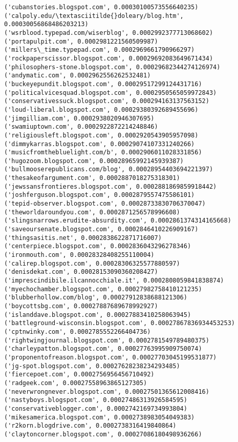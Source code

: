 \documentclass[11pt]{article}
\begin{document}
\begin{Verbatim}[commandchars=\\\{\}]
('cubanstories.blogspot.com', 0.00030100573556640235)
('calpoly.edu/\textasciitilde{}doleary/blog.htm', 0.00030056868486203213)
('wsrblood.typepad.com/wiserblog', 0.0002992377713068602)
('portapulpit.com', 0.0002981221560509987)
('millers\_time.typepad.com', 0.0002969661790966297)
('rockpaperscissor.blogspot.com', 0.00029692083649671434)
('philosophers-stone.blogspot.com', 0.00029682344274126974)
('andymatic.com', 0.0002962556262532481)
('buckeyepundit.blogspot.com', 0.00029517299124431716)
('politicalvicesquad.blogspot.com', 0.0002950565059972843)
('conservativessuck.blogspot.com', 0.000294163137563152)
('loud-liberal.blogspot.com', 0.00029380392689455696)
('jimgilliam.com', 0.0002938020946307695)
('swamiuptown.com', 0.0002922872214248846)
('religiousleft.blogspot.com', 0.0002920543905957098)
('dimmykarras.blogspot.com', 0.00029074107331240266)
('musicfromthebluelight.com/b', 0.0002906011028331856)
('hugozoom.blogspot.com', 0.00028965992145939387)
('bullmooserepublicans.com/blog', 0.00028954403694221397)
('thesakeofargument.com', 0.0002887018275318301)
('jewssansfrontieres.blogspot.com', 0.0002881869859918442)
('joshferguson.blogspot.com', 0.0002879557475586101)
('tepid-observer.blogspot.com', 0.00028733830706370047)
('theworldaroundyou.com', 0.0002871256578996608)
('slingsnarrows.erudite-absurdity.com', 0.0002861374314165668)
('saveoursenate.blogspot.com', 0.0002846410226909167)
('thingsasitis.net', 0.0002838622871716007)
('centerpiece.blogspot.com', 0.0002836043296278346)
('ironmouth.com', 0.00028328408255110004)
('calirep.blogspot.com', 0.00028306325577880597)
('denisdekat.com', 0.00028153090360208427)
('imprescindibile.ilcannocchiale.it', 0.0002808059841838874)
('myechochamber.blogspot.com', 0.00027982758410121235)
('blubberhollow.com/blog', 0.00027912838688121306)
('boycottsbg.com', 0.00027887689678992927)
('islanddave.blogspot.com', 0.00027883410258063945)
('battleground-wisconsin.blogspot.com', 0.00027867836934453253)
('cptnwinky.com', 0.0002785552266404736)
('rightwingjournal.blogspot.com', 0.0002781549789480375)
('charleypatton.blogspot.com', 0.00027763995909750074)
('proponentofreason.blogspot.com', 0.00027703045199531877)
('jg-spot.blogspot.com', 0.00027628238234293485)
('fiercepoet.com', 0.0002756956456710492)
('radgeek.com', 0.00027558963865127305)
('neverwrongnever.blogspot.com', 0.00027501365612008416)
('nastyboys.blogspot.com', 0.00027486313926584595)
('conservativeblogger.com', 0.0002742169734993804)
('mikesamerica.blogspot.com', 0.0002738983054049383)
('r2korn.blogdrive.com', 0.0002738316419840864)
('claytoncorner.blogspot.com', 0.00027086180498936266)

\end{Verbatim}
\end{document}
